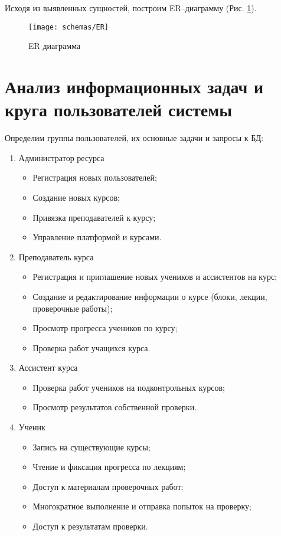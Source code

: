 \documentclass[a4paper,14pt]{article}
\begin{document}
Исходя из выявленных сущностей, построим ER–диаграмму (Рис. \ref{img:db_ER}). 

\begin{figure}[H]
	\centering		
	\texttt{[image: schemas/ER]}
	\caption{ER диаграмма}\label{img:db_ER}
\end{figure}

\section{Анализ информационных задач и круга пользователей системы}

Определим группы пользователей, их основные задачи и запросы к БД:

\begin{enumerate}
	\item Администратор ресурса
	\begin{itemize}
		\item Регистрация новых пользователей;
		\item Создание новых курсов;
		\item Привязка преподавателей к курсу;
		\item Управление платформой и курсами.
	\end{itemize}

	\item Преподаватель курса
	\begin{itemize}
		\item Регистрация и приглашение новых учеников и ассистентов на курс;
		\item Создание и редактирование информации о курсе (блоки, лекции, проверочные работы);
		\item Просмотр прогресса учеников по курсу;
		\item Проверка работ учащихся курса.
	\end{itemize}

	\item Ассистент курса
	\begin{itemize}
		\item Проверка работ учеников на подконтрольных курсов;
		\item Просмотр результатов собственной проверки.
	\end{itemize}

	\item Ученик
	\begin{itemize}
		\item Запись на существующие курсы;
		\item Чтение и фиксация прогресса по лекциям;
		\item Доступ к материалам проверочных работ;
		\item Многократное выполнение и отправка попыток на проверку;
		\item Доступ к результатам проверки.
	\end{itemize}
\end{enumerate}
\end{document}
